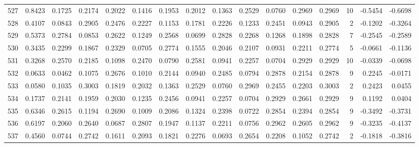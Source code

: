 \begin{tabular}{lrrrrrrrrrrrrrrr}
527 &      0.8423 &  0.1725 &  0.2174 &  0.2022 &  0.1416 &  0.1953 &  0.2012 &  0.1363 &  0.2529 &  0.0760 &   0.2969 &     0.2969 &     10 &                   -0.5454 &                    -0.6698 \\
528 &      0.4107 &  0.0843 &  0.2905 &  0.2476 &  0.2227 &  0.1153 &  0.1781 &  0.2226 &  0.1233 &  0.2451 &   0.0943 &     0.2905 &      2 &                   -0.1202 &                    -0.3264 \\
529 &      0.5373 &  0.2784 &  0.0853 &  0.2622 &  0.1249 &  0.2568 &  0.0699 &  0.2828 &  0.2268 &  0.1268 &   0.1898 &     0.2828 &      7 &                   -0.2545 &                    -0.2589 \\
530 &      0.3435 &  0.2299 &  0.1867 &  0.2329 &  0.0705 &  0.2774 &  0.1555 &  0.2046 &  0.2107 &  0.0931 &   0.2211 &     0.2774 &      5 &                   -0.0661 &                    -0.1136 \\
531 &      0.3268 &  0.2570 &  0.2185 &  0.1098 &  0.2470 &  0.0790 &  0.2581 &  0.0941 &  0.2257 &  0.0704 &   0.2929 &     0.2929 &     10 &                   -0.0339 &                    -0.0698 \\
532 &      0.0633 &  0.0462 &  0.1075 &  0.2676 &  0.1010 &  0.2144 &  0.0940 &  0.2485 &  0.0794 &  0.2878 &   0.2154 &     0.2878 &      9 &                    0.2245 &                    -0.0171 \\
533 &      0.0580 &  0.1035 &  0.3003 &  0.1819 &  0.2032 &  0.1363 &  0.2529 &  0.0760 &  0.2969 &  0.2455 &   0.2203 &     0.3003 &      2 &                    0.2423 &                     0.0455 \\
534 &      0.1737 &  0.2141 &  0.1959 &  0.2030 &  0.1235 &  0.2456 &  0.0941 &  0.2257 &  0.0704 &  0.2929 &   0.2661 &     0.2929 &      9 &                    0.1192 &                     0.0404 \\
535 &      0.6346 &  0.2615 &  0.1194 &  0.2690 &  0.1009 &  0.2086 &  0.1324 &  0.2398 &  0.0722 &  0.2854 &   0.2394 &     0.2854 &      9 &                   -0.3492 &                    -0.3731 \\
536 &      0.6197 &  0.2060 &  0.2640 &  0.0687 &  0.2807 &  0.1947 &  0.1137 &  0.2211 &  0.0756 &  0.2962 &   0.2605 &     0.2962 &      9 &                   -0.3235 &                    -0.4137 \\
537 &      0.4560 &  0.0744 &  0.2742 &  0.1611 &  0.2093 &  0.1821 &  0.2276 &  0.0693 &  0.2654 &  0.2208 &   0.1052 &     0.2742 &      2 &                   -0.1818 &                    -0.3816 \\

\end{tabular}
